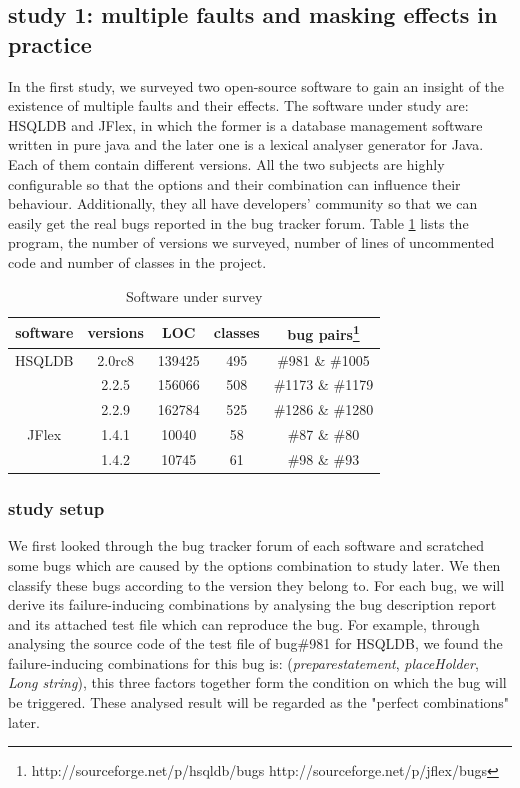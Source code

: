 \documentclass{sig-alternate}
\begin{document}
\subsection{study 1: multiple faults and masking effects in practice}
In the first study, we surveyed two open-source software to gain an insight of the existence of multiple faults and their effects. The software under study are: HSQLDB and JFlex, in which the former is a database management software written in pure java and the later one is a lexical analyser generator for Java. Each of them contain different versions. All the two subjects are highly configurable so that the options and their combination can influence their behaviour. Additionally, they all have developers' community so that we can easily get the real bugs reported in the bug tracker forum. Table \ref{software description} lists the program, the number of versions we surveyed, number of lines of uncommented code and number of classes in the project.

\begin{table}\renewcommand{\arraystretch}{1.3}
\caption{Software under survey}
\label{software description}
\begin{tabular}{c|c|c|c|c} \hline
software & versions & LOC & classes & bug pairs\footnote{ http://sourceforge.net/p/hsqldb/bugs
http://sourceforge.net/p/jflex/bugs  } \\ \hline

HSQLDB  &2.0rc8 & 139425 & 495 &  \#981 \& \#1005\\
	   &2.2.5 & 156066 & 508 & \#1173 \&  \#1179\\
	    &2.2.9 & 162784 &525 & \#1286 \& \#1280\\
JFlex  &1.4.1 &  10040 &58 & \#87 \& \#80 \\
      &1.4.2 &  10745 &61 &  \#98 \& \#93  \\
\hline\end{tabular}
\end{table}



\subsubsection{study setup}
We first looked through the bug tracker forum of each software and scratched some bugs which are caused by the options combination to study later. We then classify these bugs according to the version they belong to. For each bug, we will derive its failure-inducing combinations by analysing the bug description report and its attached test file which can reproduce the bug. For example, through analysing the source code of the test file of bug\#981 for HSQLDB, we found the failure-inducing combinations for this bug is: (\emph{preparestatement}, \emph{placeHolder}, \emph{Long string}), this three factors together form the condition on which the bug will be triggered. These analysed result will be regarded as the "perfect combinations" later.
\end{document}
